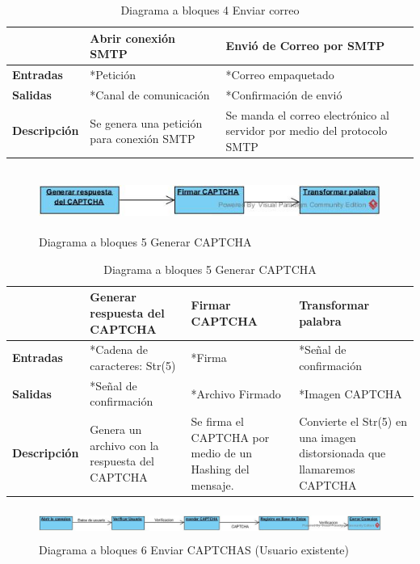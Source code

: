 \documentclass[12pt,oneside,onecolumn,openany]{report}
\begin{document}
\begin{table}[H]
 \centering
   {
     \begin{tabular}{| p{4cm} | p{4cm} | p{4cm} |}
     \hline
     & \textbf{Abrir conexión SMTP} & \textbf{Envió de Correo por SMTP}\\
     \hline
     \textbf{Entradas} & *Petición & *Correo empaquetado\\
     \hline
     \textbf{Salidas} & *Canal de comunicación & *Confirmación de envió\\
     \hline
     \textbf{Descripción} & Se genera una petición para conexión SMTP  & Se manda el correo electrónico al servidor por medio del protocolo SMTP\\

    \end{tabular}
    }
    \caption{Diagrama a bloques 4 Enviar correo}
    \label{tabla:b4}
\end{table}
\clearpage
\begin{figure}[H]
	\includegraphics[width=1\linewidth, height=2cm]{./images/bloques5.jpg}
	\caption{Diagrama a bloques 5 Generar CAPTCHA}
	\label{fig:5-5-1}
\end{figure}
\begin{table}[H]
 \centering
   {
     \begin{tabular}{| p{4cm} | p{4cm} | p{4cm} | p{4cm} |}
     \hline
     & \textbf{Generar respuesta del CAPTCHA} & \textbf{Firmar CAPTCHA} & \textbf{Transformar palabra}\\
     \hline
     \textbf{Entradas} & *Cadena de caracteres: Str(5) & *Firma & *Señal de confirmación\\
     \hline
     \textbf{Salidas} & *Señal de confirmación & *Archivo Firmado & *Imagen CAPTCHA\\
     \hline
     \textbf{Descripción} & Genera un archivo con la respuesta del CAPTCHA  & Se firma el CAPTCHA por medio de un Hashing del mensaje. & Convierte el Str(5) en una imagen distorsionada que llamaremos CAPTCHA\\

    \end{tabular}
    }
    \caption{Diagrama a bloques 5 Generar CAPTCHA}
    \label{tabla:b5}
\end{table}
\newpage
\begin{figure}[H]
	\includegraphics[width=1\linewidth, height=1cm]{./images/bloques6.jpg}
	\caption{Diagrama a bloques 6 Enviar CAPTCHAS (Usuario existente)}
	\label{fig:5-6-1}
\end{figure}
\end{document}
